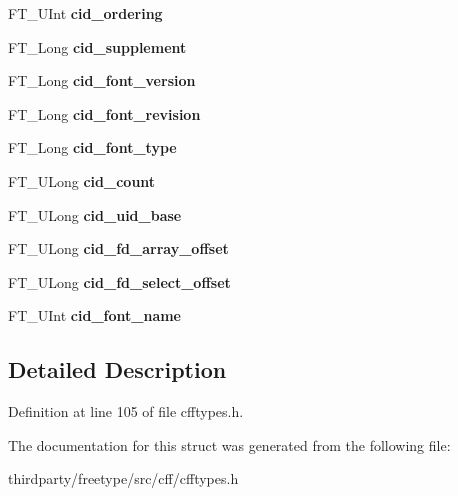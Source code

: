 \begin{DoxyCompactItemize}
F\+T\+\_\+\+U\+Int {\bfseries cid\+\_\+ordering}
\item 
\mbox{\label{struct_c_f_f___font_rec_dict_rec___aec1c1dda6525d5022709b4ae231935f0}} 
F\+T\+\_\+\+Long {\bfseries cid\+\_\+supplement}
\item 
\mbox{\label{struct_c_f_f___font_rec_dict_rec___a08826dd28e822f2726f5f06bab95452a}} 
F\+T\+\_\+\+Long {\bfseries cid\+\_\+font\+\_\+version}
\item 
\mbox{\label{struct_c_f_f___font_rec_dict_rec___ae41feaa126d617a536dbe6f77271dea3}} 
F\+T\+\_\+\+Long {\bfseries cid\+\_\+font\+\_\+revision}
\item 
\mbox{\label{struct_c_f_f___font_rec_dict_rec___a8814da892ecd2b053d424ccc0090d9d8}} 
F\+T\+\_\+\+Long {\bfseries cid\+\_\+font\+\_\+type}
\item 
\mbox{\label{struct_c_f_f___font_rec_dict_rec___a7936959aabd231532a55aa57240ad40d}} 
F\+T\+\_\+\+U\+Long {\bfseries cid\+\_\+count}
\item 
\mbox{\label{struct_c_f_f___font_rec_dict_rec___a0ab640f897f8c1de341c5d4e89f65307}} 
F\+T\+\_\+\+U\+Long {\bfseries cid\+\_\+uid\+\_\+base}
\item 
\mbox{\label{struct_c_f_f___font_rec_dict_rec___a49f5a83428e7a19437066573d240c0a3}} 
F\+T\+\_\+\+U\+Long {\bfseries cid\+\_\+fd\+\_\+array\+\_\+offset}
\item 
\mbox{\label{struct_c_f_f___font_rec_dict_rec___a5d108f4b088f4a3b338e2aa7a77a3a59}} 
F\+T\+\_\+\+U\+Long {\bfseries cid\+\_\+fd\+\_\+select\+\_\+offset}
\item 
\mbox{\label{struct_c_f_f___font_rec_dict_rec___a80084cd662e7f3699aea9b7d747f04e2}} 
F\+T\+\_\+\+U\+Int {\bfseries cid\+\_\+font\+\_\+name}
\end{DoxyCompactItemize}


\subsection{Detailed Description}


Definition at line 105 of file cfftypes.\+h.



The documentation for this struct was generated from the following file\+:\begin{DoxyCompactItemize}
\item 
thirdparty/freetype/src/cff/cfftypes.\+h\end{DoxyCompactItemize}

